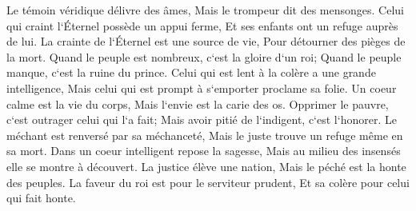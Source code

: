 \verse Le témoin véridique délivre des âmes, Mais le trompeur dit des mensonges. 
\verse Celui qui craint l`Éternel possède un appui ferme, Et ses enfants ont un refuge auprès de lui. 
\verse La crainte de l`Éternel est une source de vie, Pour détourner des pièges de la mort. 
\verse Quand le peuple est nombreux, c`est la gloire d`un roi; Quand le peuple manque, c`est la ruine du prince. 
\verse Celui qui est lent à la colère a une grande intelligence, Mais celui qui est prompt à s`emporter proclame sa folie. 
\verse Un coeur calme est la vie du corps, Mais l`envie est la carie des os. 
\verse Opprimer le pauvre, c`est outrager celui qui l`a fait; Mais avoir pitié de l`indigent, c`est l`honorer. 
\verse Le méchant est renversé par sa méchanceté, Mais le juste trouve un refuge même en sa mort. 
\verse Dans un coeur intelligent repose la sagesse, Mais au milieu des insensés elle se montre à découvert. 
\verse La justice élève une nation, Mais le péché est la honte des peuples. 
\verse La faveur du roi est pour le serviteur prudent, Et sa colère pour celui qui fait honte. 

\chapter{}

